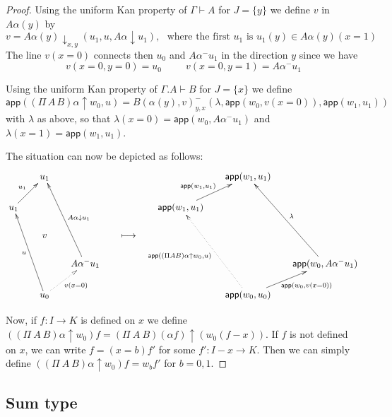 \documentclass[10pt,a4paper]{article}
\newcommand{\app}{\mathsf{app}}
\newcommand{\set}[1]{\{#1\}}
\newcommand{\lto}{\longmapsto}
\newcommand{\rup}[1]{#1{\uparrow}}
\newcommand{\rdo}[1]{#1{\downarrow}}
\newcommand{\rdoxy}[1]{#1{\downarrow_{x,y}}}
\begin{document}
\begin{proof}
  Using the uniform Kan property of $\Gamma\vdash A$ for $J=\set{y}$
  we define $v$ in $A\alpha(y)$ by
  $$
  v = \rdoxy{A\alpha(y)}(u_1,u,\rdo{A\alpha} u_1),~~~\text{where the
    first $u_1$ is $u_1(y) \in A\alpha(y)(x=1)$}
  $$
  The line $v(x=0)$ connects then $u_0$ and $A\alpha^-u_1$ in the
  direction $y$ since we have
  $$
  v(x=0,y=0) = u_0~~~~~~~~~~~v(x=0,y=1) = A\alpha^- u_1
  $$

  Using the uniform Kan property of $\Gamma.A\vdash B$ for $J=\set{x}$
  we define
  $$
  \app(\rup{(\Pi\,A\,B)\alpha} w_0,u) =
  {B(\alpha(y),v)}^-_{y,x}(\lambda,\app(w_0,v(x=0)),\app(w_1,u_1))
  $$
  with $\lambda$ as above, so that $\lambda(x=0) = \app(w_0,A\alpha^-
  u_1)$ and $\lambda(x=1) = \app(w_1,u_1)$.

  The situation can now be depicted as follows:
  \[
  \xymatrix@R=.6cm@C=.6cm{
    &u_1&                                                                          &&  &\app(w_1,u_1)&\\
    u_1\ar[ur]^{u_1}&&                                               &&  \app(w_1,u_1)\ar[ur]^{ \app(w_1,u_1)~~~}&&\\
    &v&                                                                          &\lto& &   &\\
    &&A\alpha^- u_1\ar[uuul]_{\rdo{A\alpha}u_1}     &&  &&\app(w_0,A\alpha^- u_1)\ar[uuul]_{\lambda} \\
    &u_0\ar[uuul]^u \ar@{.>}[ur]_{v(x=0)}&                 &&  &\app(w_0,u_0)\ar@{.>}[uuul]^{\app(\rup{(\Pi A B)\alpha} w_0,u)} \ar[ur]_{~~~~\app(w_0,v(x=0))}&\\
  }
  \]

  Now, if $f:I\to K$ is defined on $x$ we define
  $(\rup{(\Pi~A~B)\alpha} w_0) f = \rup{(\Pi~A~B)(\alpha f)} (w_0
  (f-x))$.  If $f$ is not defined on $x$, we can write $f=(x=b)f'$ for
  some $f':I-x \to K$.  Then we can simply define
  $(\rup{(\Pi~A~B)\alpha} w_0) f = w_b f'$ for $b=0,1$.
\end{proof}

\subsection{Sum type}
\end{document}
